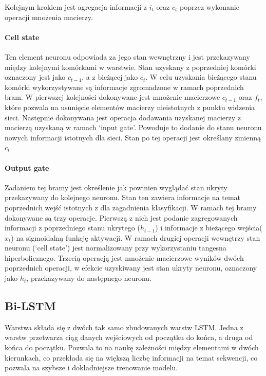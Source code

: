 Kolejnym krokiem jest agregacja informacji z $i_t$ oraz $c_t$ poprzez wykonanie operacji mnożenia macierzy.

\paragraph{Cell state}  \hfill

Ten element neuronu odpowiada za jego stan wewnętrzny i jest przekazywany między kolejnymi komórkami w warstwie. Stan uzyskany z poprzedniej komórki oznaczony jest jako $c_{t-1}$, a z bieżącej jako $c_t$. W celu uzyskania bieżącego stanu komórki wykorzystywane są informacje zgromadzone w ramach poprzednich bram. W pierwszej kolejności dokonywane jest mnożenie macierzowe $c_{t-1}$ oraz $f_t$, które pozwala na usunięcie elementów macierzy nieistotnych z punktu widzenia sieci. Następnie dokonywana jest operacja dodawania uzyskanej macierzy z macierzą uzyskaną w ramach ‘input gate’. Powoduje to dodanie do stanu neuronu nowych informacji istotnych dla sieci. Stan po tej operacji jest określany zmienną $c_t$.


\paragraph{Output gate}  \hfill

Zadaniem tej bramy jest określenie jak powinien wyglądać stan ukryty przekazywany do kolejnego neuronu. Stan ten zawiera informacje na temat poprzednich wejść istotnych z dla zagadnienia klasyfikacji. W ramach tej bramy dokonywane są trzy operacje. Pierwszą z nich jest podanie zagregowanych informacji z poprzedniego stanu ukrytego ($h_{t-1}$) i informacje z bieżącego wejścia($x_t$) na sigmoidalną funkcję aktywacji. W ramach drugiej operacji wewnętrzy stan neuronu (‘cell state’) jest normalizowany przy wykorzystaniu tangesna hiperbolicznego. Trzecią operacją jest mnożenie macierzowe wyników dwóch poprzednich operacji, w efekcie uzyskiwany jest stan ukryty neuronu, oznaczony jako $h_t$, przekazywany do następnego neuronu.

\subsection{Bi-LSTM}


Warstwa składa się z dwóch tak samo zbudowanych warstw LSTM. Jedna z warstw przetwarza ciąg danych wejściowych od początku do końca, a druga od końca do początku. Pozwala to na naukę zależności między elementami w dwóch kierunkach, co przekłada się na większą liczbę informacji na temat sekwencji, co pozwala na szybsze i dokładniejsze trenowanie modelu.





